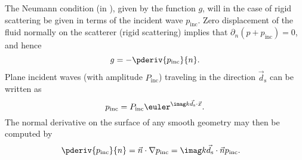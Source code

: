 The Neumann condition (in ), given by the function $g$, will in the case of rigid scattering be given in terms of the incident wave $p_{\mathrm{inc}}$. Zero displacement of the fluid normally on the scatterer (rigid scattering) implies that $\partial_n(p+p_{\mathrm{inc}}) = 0$, and hence
\begin{equation}
	g = -\pderiv{p_{\mathrm{inc}}}{n}.
\end{equation}
Plane incident waves (with amplitude $P_{\mathrm{inc}}$) traveling in the direction $\vec{d}_{\mathrm{s}}$ can be written as
\begin{equation}\label{Eq3:p_inc}
	p_{\mathrm{inc}} = P_{\mathrm{inc}}\euler^{\imag k\vec{d}_{\mathrm{s}}\cdot\vec{x}}.
\end{equation}
The normal derivative on the surface of any smooth geometry may then be computed by
\begin{align}
	\pderiv{p_{\mathrm{inc}}}{n} &= \vec{n}\cdot\nabla p_{\mathrm{inc}} = \imag k\vec{d}_{\mathrm{s}}\cdot\vec{n} p_{\mathrm{inc}}.
\end{align}

